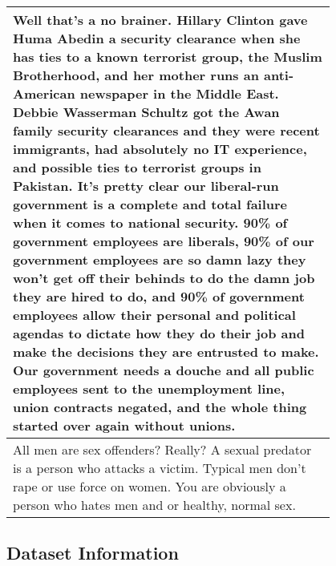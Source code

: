 \begin{longtable}{@{\makebox[3em][r]{\rownumber\space}} | p{0.8\linewidth}}
	\hline
	Well that’s a no brainer. Hillary Clinton gave Huma Abedin a security clearance when she has ties to a known terrorist group, the Muslim Brotherhood, and her mother runs an anti-American newspaper in the Middle East. Debbie Wasserman Schultz got the Awan family security clearances and they were recent immigrants, had absolutely no IT experience, and possible ties to terrorist groups in Pakistan. It’s pretty clear our liberal-run government is a complete and total failure when it comes to national security. 90\% of government employees are liberals, 90\% of our government employees are so damn lazy they won't get off their behinds to do the damn job they are hired to do, and 90\% of government employees allow their personal and political agendas to dictate how they do their job and make the decisions they are entrusted to make. Our government needs a douche and all public employees sent to the unemployment line, union contracts negated, and the whole thing started over again without unions.\\
	\hline
	All men are sex offenders? Really? A sexual predator is a person who attacks a victim. Typical men don’t rape or use force on women. You are obviously a person who hates men and or healthy, normal sex.\\
	\hline
\end{longtable}

\subsection{Dataset Information}

